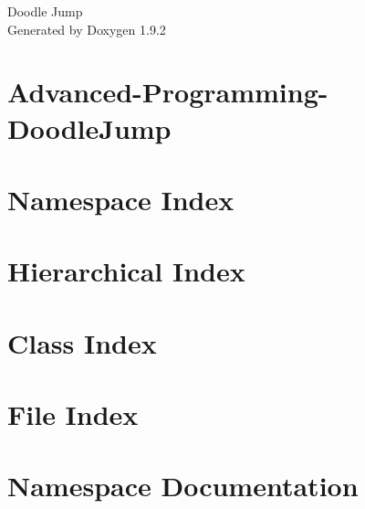 \documentclass[twoside]{book}
\newcommand{\+}{\discretionary{\mbox{\scriptsize$\hookleftarrow$}}{}{}}
\newcommand{\clearemptydoublepage}{%
    \newpage{\pagestyle{empty}\cleardoublepage}%
  }
\begin{document}
  \raggedbottom
    \hypersetup{pageanchor=false,
                bookmarksnumbered=true,
                pdfencoding=unicode
               }
  \begin{titlepage}
  \vspace*{7cm}
  \begin{center}%
  {\Large Doodle Jump}\\
  \vspace*{1cm}
  {\large Generated by Doxygen 1.9.2}\\
  \end{center}
  \end{titlepage}
  \clearemptydoublepage
  \tableofcontents
  \clearemptydoublepage
  \hypersetup{pageanchor=true}
\chapter{Advanced-\/\+Programming-\/\+Doodle\+Jump}
\label{md___users_pablodeputter__documents__git_hub__advanced__programming__doodle_jump__r_e_a_d_m_e}

\chapter{Namespace Index}

\chapter{Hierarchical Index}

\chapter{Class Index}

\chapter{File Index}

\chapter{Namespace Documentation}




\end{document}
